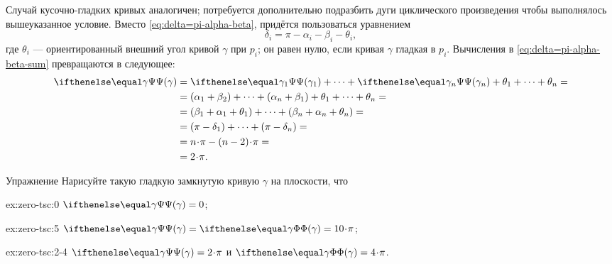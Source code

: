 {\sloppy

Случай кусочно-гладких кривых аналогичен;
потребуется дополнительно подразбить дуги циклического произведения чтобы выполнялось вышеуказанное условие.
Вместо \ref{eq:delta=pi-alpha-beta}, придётся пользоваться уравнением
\[\delta_i=\pi-\alpha_i-\beta_i-\theta_i,\]
где $\theta_i$ --- ориентированный внешний угол кривой $\gamma$ при $p_i$;
он равен нулю, если кривая $\gamma$ гладкая в $p_i$.
Вычисления в \ref{eq:delta=pi-alpha-beta-sum} превращаются в следующее:
\begin{align*}
\tgc\gamma&=\tgc{\gamma_1}+\dots+\tgc{\gamma_n}+\theta_1+\dots+\theta_n=
\\
&=(\alpha_1+\beta_2)+\dots+(\alpha_n+\beta_1)+\theta_1+\dots+\theta_n=
\\
&=(\beta_1+\alpha_1+\theta_1)+\dots+(\beta_n+\alpha_n+\theta_n)=
\\
&=(\pi-\delta_1)+\dots+(\pi-\delta_n)=
\\
&=n\cdot\pi-(n-2)\cdot \pi=
\\
&=2\cdot\pi.
\end{align*}
\qedsf

}

\begin{thm}{Упражнение}\label{ex:zero-tsc}
Нарисуйте такую гладкую замкнутую кривую $\gamma$ на плоскости, что

\begin{subthm}{ex:zero-tsc:0}
$\tgc\gamma=0$;
\end{subthm}
 
\begin{subthm}{ex:zero-tsc:5}
$\tgc\gamma=\tc\gamma=10\cdot\pi$;
\end{subthm}

\begin{subthm}{ex:zero-tsc:2-4}
$\tgc\gamma=2\cdot\pi$ и $\tc\gamma=4\cdot\pi$.
\end{subthm}

\end{thm}

